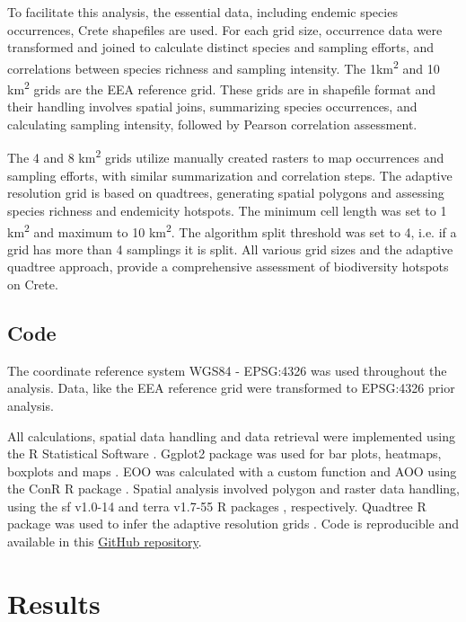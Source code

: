 To facilitate this analysis, the essential data, including endemic species occurrences, Crete shapefiles
are used. For each grid size, occurrence
data were transformed and joined to calculate distinct species and sampling efforts,
and correlations between species richness and sampling intensity.
The 1km\textsuperscript{2} and 10 km\textsuperscript{2} grids are the 
EEA reference grid.
These grids are in shapefile format and their handling involves spatial joins,
summarizing species occurrences, and calculating sampling intensity,
followed by Pearson correlation assessment.

The 4 and 8 km\textsuperscript{2} grids utilize manually created rasters to map occurrences and
sampling efforts, with similar summarization and correlation steps.
The adaptive resolution grid is based on quadtrees, generating spatial polygons
and assessing species richness and endemicity hotspots.
The minimum cell length was set to 1 km\textsuperscript{2} and maximum to 10 km\textsuperscript{2}.
The algorithm split threshold was set to 4, i.e. if a grid has more than 4 samplings
it is split.
All various grid sizes and the adaptive quadtree approach, provide a comprehensive assessment of biodiversity hotspots on Crete.


    \subsection{Code}
    \label{subsec:arthropods-tools}

The coordinate reference system WGS84 - EPSG:4326 was used throughout the analysis.
Data, like the EEA reference grid were transformed to EPSG:4326 prior analysis.

All calculations, spatial data handling and data retrieval were implemented using the R Statistical Software \parencite{rcoreteam}.
Ggplot2 package was used for bar plots, heatmaps, boxplots and maps \parencite{wickham_ggplot2_2016}.
EOO was calculated with a custom function and AOO using the ConR R package \parencite{dauby2017conr:}.
Spatial analysis involved polygon and raster data handling, using the sf v1.0-14 \parencite{pebesma2018simple}
and terra v1.7-55 R packages \parencite{hijmans2024terra}, respectively.
Quadtree R package was used to infer the adaptive resolution grids \parencite{friend2023quadtree}.
Code is reproducible and available in this 
\href{https://github.com/savvas-paragkamian/arthropoda_assessment_crete}{GitHub repository}.


\section{Results}
\label{sec:arthropods-results}

